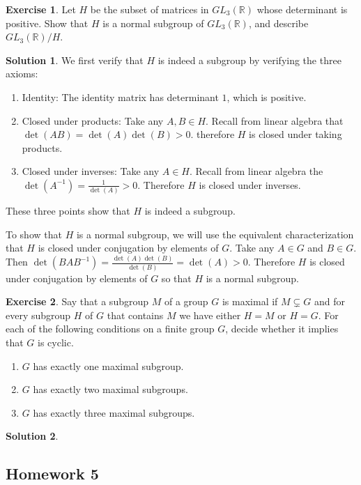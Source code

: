\documentclass[12pt]{article}
\theoremstyle{definition}
\newcommand{\R}{\mathbb{R}}
\newtheorem{exercise}{\color{YellowOrange}Exercise}
\theoremstyle{definition}
\newtheorem{solution}{\color{Goldenrod}Solution}
\begin{document}
\begin{exercise}
Let $H$ be the subset of matrices in $GL_3(\R)$ whose determinant is positive. Show that $H$ is a normal subgroup of $GL_3(\R)$, and describe $GL_3(\R) / H$.
\end{exercise}
\begin{solution}
We first verify that $H$ is indeed a subgroup by verifying the three axioms:
\begin{enumerate}
	\item Identity: The identity matrix has determinant $1$, which is positive. 
	\item Closed under products: Take any $A, B \in H$. Recall from linear algebra that $\det(AB) = \det(A)\det(B) > 0$. therefore $H$ is closed under taking products. 
	\item Closed under inverses: Take any $A \in H$. Recall from linear algebra the $\det(A^{-1}) = \frac{1}{\det(A)} > 0$. Therefore $H$ is closed under inverses. 
\end{enumerate}
These three points show that $H$ is indeed a subgroup. 

To show that $H$ is a normal subgroup, we will use the equivalent characterization that $H$ is closed under conjugation by elements of $G$. Take any $A \in G$ and $B \in G$. Then $\det(BAB^{-1}) = \frac{\det(A)\det(B)}{\det(B)} = \det(A) > 0$. Therefore $H$ is closed under conjugation by elements of $G$ so that $H$ is a normal subgroup.   
\end{solution}	

\begin{exercise}
Say that a subgroup $M$ of a group $G$ is maximal if $M \subsetneq G$ and for every subgroup $H$ of $G$ that contains $M$ we have either $H = M$ or $H = G$. For each of the following conditions on a finite group $G$, decide whether it implies that $G$ is cyclic.
\begin{enumerate}
	\item $G$ has exactly one maximal subgroup.
	\item $G$ has exactly two maximal subgroups. 
	\item $G$ has exactly three maximal subgroups. 
\end{enumerate} 
\end{exercise}
\begin{solution}

\end{solution}

\subsection{Homework 5}
\end{document}
